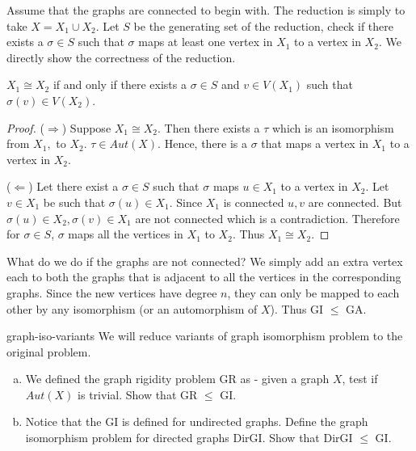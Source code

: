 Assume that the graphs are connected to begin with. The reduction is simply to take $X = X_1 \cup X_2$. Let $S$ be the generating set of the reduction, check if there exists a $\sigma \in S$ such that $\sigma$ maps at least one vertex in $X_1$ to a vertex in $X_2$. We directly show the correctness of the reduction.

\begin{claim}
$X_1 \cong X_2$ if and only if there exists a $\sigma \in S$ and $v \in V(X_1)$ such that $\sigma(v) \in V(X_2)$.
\end{claim}
\begin{proof}
($\Rightarrow$) Suppose $X_1 \cong X_2$. Then there exists a $\tau$ which is an isomorphism from $X_1,$ to $X_2$. $\tau \in Aut(X)$. Hence, there is a $\sigma$ that maps a vertex in $X_1$ to a vertex in $X_2$.

($\Leftarrow$) Let there exist a $\sigma\in S$ such that $\sigma$ maps $u \in X_1$ to a vertex in $X_2$. Let $v \in X_1$ be such that $\sigma(u) \in X_1$. Since $X_1$ is connected $u,v$ are connected. But $\sigma(u) \in X_2, \sigma(v) \in X_1$ are not connected which is a contradiction. Therefore for $\sigma\in S$, $\sigma$ maps all the vertices in $X_1$ to $X_2$. Thus $X_1 \cong X_2$.
\end{proof}

What do we do if the graphs are not connected? We simply add an extra vertex each to both the graphs that is adjacent to all the vertices in the corresponding graphs. Since the new vertices have degree $n$, they can only be mapped to each other by any isomorphism (or an automorphism of $X$). Thus GI $\le$ GA.


\begin{exercise-prob}
	\begin{show-ps1}{graph-iso-variants}
	We will reduce variants of graph isomorphism problem to the original problem.
	\begin{enumerate}[(a)]
	\item We defined the graph rigidity problem {\sc GR} as - given a graph $X$, test if $Aut(X)$ is trivial. Show that {\sc GR} $\le$ {\sc GI}.
	\item Notice that the {\sc GI} is defined for undirected graphs. Define the graph isomorphism problem for directed graphs {\sc DirGI}. Show that {\sc DirGI} $\le$ {\sc GI}.
	\end{enumerate}
	\end{show-ps1}
\end{exercise-prob}


